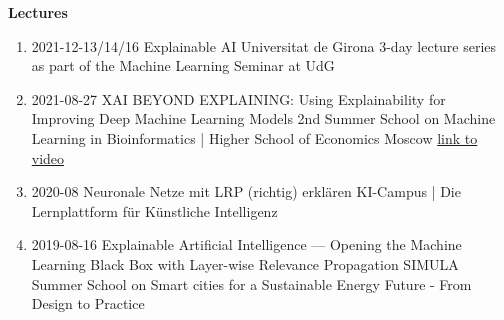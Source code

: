 \documentclass[10pt,a4paper]{article} %
\begin{document}
\headedsection
{\bf Lectures}{}
{
\begin{enumerate}
    \item {}
                    {2021-12-13/14/16}
                    {Explainable AI}
                    {Universitat de Girona}
                    {3-day lecture series as part of the Machine Learning Seminar at UdG}
    \item {}
                    {2021-08-27}
                    {XAI BEYOND EXPLAINING: Using Explainability for Improving Deep Machine Learning Models}
                    {2nd Summer School on Machine Learning in Bioinformatics | Higher School of Economics Moscow}
                    {\href{https://www.youtube.com/watch?v=fHBSLzJ4zbA}{link to video}}
    \item {}
                    {2020-08}
                    {Neuronale Netze mit LRP (richtig) erklären}
                    {KI-Campus | Die Lernplattform für Künstliche Intelligenz}
    \item {}
                    {2019-08-16}
                    {Explainable Artificial Intelligence --- Opening the Machine Learning Black Box with Layer-wise Relevance Propagation}
                    {SIMULA Summer School on Smart cities for a Sustainable Energy Future - From Design to Practice}
\end{enumerate}
}


\spacedhrule{0.5em}{-0.4em} %
\end{document}
